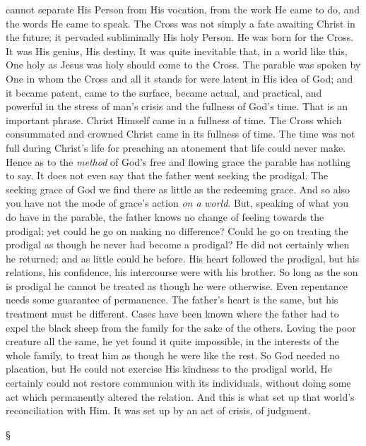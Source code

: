 \documentclass[12pt,a5paper,twoside,titlepage]{book}
\begin{document}
cannot separate His Person from His vocation, 
from the work He came to do, and the words He 
came to speak. The Cross was not simply a 
fate awaiting Christ in the future; it pervaded 
subliminally His holy Person. He was born for 
the Cross. It was His genius, His destiny. It 
was quite inevitable that, in a world like this, 
One holy as Jesus was holy should come to the 
Cross. The parable was spoken by One in 
whom the Cross and all it stands for were 
latent in His idea of God; and it became 
patent, came to the surface, became actual, 
and practical, and powerful in the stress of 
man's crisis and the fullness of God's time. 
That is an important phrase. Christ Himself 
came in a fullness of time. The Cross which 
consummated and crowned Christ came in its 
fullness of time. The time was not full during 
Christ's life for preaching an atonement that life 
could never make. Hence as to the \textit{method} of 
God's free and flowing grace the parable has 
nothing to say. It does not even say that 
the father went seeking the prodigal. The 
seeking grace of God we find there as little 
as the redeeming grace. And so also you 
have not the mode of grace's action \textit{on a} 
\textit{world}. But, speaking of what you do have in 
the parable, the father knows no change of 
feeling towards the prodigal; yet could he go 
on making no difference? Could he go on 
treating the prodigal as though he never had 
become a prodigal? He did not certainly when 
he returned; and as little could he before. 
His heart followed the prodigal, but his relations, 
his confidence, his intercourse were 
with his brother. So long as the son is prodigal 
he cannot be treated as though he were 
otherwise. Even repentance needs some guarantee 
of permanence. The father's heart is 
the same, but his treatment must be different. 
Cases have been known where the father had 
to expel the black sheep from the family for 
the sake of the others. Loving the poor 
creature all the same, he yet found it quite 
impossible, in the interests of the whole family, 
to treat him as though he were like the rest. 
So God needed no placation, but He could not 
exercise His kindness to the prodigal world, He 
certainly could not restore communion with its 
individuals, without doing some act which permanently 
altered the relation. And this is what 
set up that world's reconciliation with Him. It 
was set up by an act of crisis, of judgment. 

\begin{center}
\S
\end{center}
\end{document}

